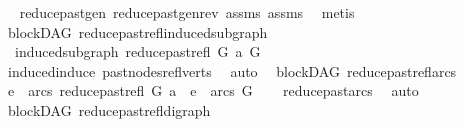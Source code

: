 \begin{isabellebody}
%
\isadelimproof
\ \ %
\endisadelimproof
%
\isatagproof
{}\isamarkupfalse%
\ reduce{\isacharunderscore}{\kern0pt}past{\isacharunderscore}{\kern0pt}gen\ reduce{\isacharunderscore}{\kern0pt}past{\isacharunderscore}{\kern0pt}gen{\isacharunderscore}{\kern0pt}rev\ assms\ assms\ \isamarkupfalse%
\ metis%
\endisatagproof
{\isafoldproof}%
%
\isadelimproof
%
\endisadelimproof
%
\isadelimdocument
%
\endisadelimdocument
%
\isatagdocument
%
\isamarkuptrue%
%
\endisatagdocument
{\isafolddocument}%
%
\isadelimdocument
%
\endisadelimdocument
{}\isamarkupfalse%
\ {\isacharparenleft}{\kern0pt}\ blockDAG{\isacharparenright}{\kern0pt}\ reduce{\isacharunderscore}{\kern0pt}past{\isacharunderscore}{\kern0pt}refl{\isacharunderscore}{\kern0pt}induced{\isacharunderscore}{\kern0pt}subgraph{\isacharcolon}{\kern0pt}\isanewline
\ \ \ {\isachardoublequoteopen}induced{\isacharunderscore}{\kern0pt}subgraph\ {\isacharparenleft}{\kern0pt}reduce{\isacharunderscore}{\kern0pt}past{\isacharunderscore}{\kern0pt}refl\ G\ a{\isacharparenright}{\kern0pt}\ G{\isachardoublequoteclose}\isanewline
%
\isadelimproof
\ \ %
\endisadelimproof
%
\isatagproof
{}\isamarkupfalse%
\ \ induced{\isacharunderscore}{\kern0pt}induce\ past{\isacharunderscore}{\kern0pt}nodes{\isacharunderscore}{\kern0pt}refl{\isacharunderscore}{\kern0pt}verts\ \isamarkupfalse%
\ auto%
\endisatagproof
{\isafoldproof}%
%
\isadelimproof
\isanewline
%
\endisadelimproof
\isanewline
{}\isamarkupfalse%
\ {\isacharparenleft}{\kern0pt}\ blockDAG{\isacharparenright}{\kern0pt}\ reduce{\isacharunderscore}{\kern0pt}past{\isacharunderscore}{\kern0pt}refl{\isacharunderscore}{\kern0pt}arcs{}{\isacharcolon}{\kern0pt}\isanewline
\ \ {\isachardoublequoteopen}e\ {\isasymin}\ arcs\ {\isacharparenleft}{\kern0pt}reduce{\isacharunderscore}{\kern0pt}past{\isacharunderscore}{\kern0pt}refl\ G\ a{\isacharparenright}{\kern0pt}\ {\isasymLongrightarrow}\ e\ {\isasymin}\ arcs\ G{\isachardoublequoteclose}\isanewline
%
\isadelimproof
\ \ %
\endisadelimproof
%
\isatagproof
{}\isamarkupfalse%
\ reduce{\isacharunderscore}{\kern0pt}past{\isacharunderscore}{\kern0pt}arcs\ \isamarkupfalse%
\ auto%
\endisatagproof
{\isafoldproof}%
%
\isadelimproof
\isanewline
%
\endisadelimproof
\isanewline
{}\isamarkupfalse%
\ {\isacharparenleft}{\kern0pt}\ blockDAG{\isacharparenright}{\kern0pt}\ reduce{\isacharunderscore}{\kern0pt}past{\isacharunderscore}{\kern0pt}refl{\isacharunderscore}{\kern0pt}digraph{\isacharcolon}{\kern0pt}\isanewline

\end{isabellebody}
